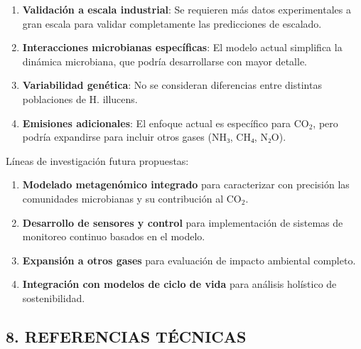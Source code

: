 \documentclass[
]{article}
\begin{document}
\begin{enumerate}
\def\labelenumi{\arabic{enumi}.}
\item
  \textbf{Validación a escala industrial}: Se requieren más datos
  experimentales a gran escala para validar completamente las
  predicciones de escalado.
\item
  \textbf{Interacciones microbianas específicas}: El modelo actual
  simplifica la dinámica microbiana, que podría desarrollarse con mayor
  detalle.
\item
  \textbf{Variabilidad genética}: No se consideran diferencias entre
  distintas poblaciones de H. illucens.
\item
  \textbf{Emisiones adicionales}: El enfoque actual es específico para
  CO$_2$, pero podría expandirse para incluir otros gases (NH₃, CH₄, N₂O).
\end{enumerate}

Líneas de investigación futura propuestas:

\begin{enumerate}
\def\labelenumi{\arabic{enumi}.}
\item
  \textbf{Modelado metagenómico integrado} para caracterizar con
  precisión las comunidades microbianas y su contribución al CO$_2$.
\item
  \textbf{Desarrollo de sensores y control} para implementación de
  sistemas de monitoreo continuo basados en el modelo.
\item
  \textbf{Expansión a otros gases} para evaluación de impacto ambiental
  completo.
\item
  \textbf{Integración con modelos de ciclo de vida} para análisis
  holístico de sostenibilidad.
\end{enumerate}

\subsection{8. REFERENCIAS TÉCNICAS}\label{referencias-tuxe9cnicas}
\end{document}
